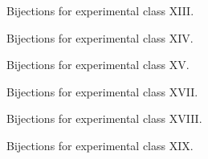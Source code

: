\begin{comment}
\begin{figure}[ht!]
    \centering
    
    \caption{Bijections for experimental class XII.}
    \label{fig:expgrp_XII}
\end{figure}
\end{comment}


\begin{figure}[ht!]
    \centering
    
    \caption{Bijections for experimental class XIII.}
    \label{fig:expgrp_XIII}
\end{figure}


\begin{figure}[ht!]
    \centering
    
    \caption{Bijections for experimental class XIV.}
    \label{fig:expgrp_XIV}
\end{figure}


\begin{figure}[ht!]
    \centering
    
    \caption{Bijections for experimental class XV.}
    \label{fig:expgrp_XV}
\end{figure}


\begin{comment}
\begin{figure}[ht!]
    \centering
    
    \caption{Bijections for experimental class XVI.}
    \label{fig:expgrp_XVI}
\end{figure}
\end{comment}


\begin{figure}[ht!]
    \centering
    
    \caption{Bijections for experimental class XVII.}
    \label{fig:expgrp_XVII}
\end{figure}


\begin{figure}[ht!]
    \centering
    
    \caption{Bijections for experimental class XVIII.}
    \label{fig:expgrp_XVIII}
\end{figure}


\begin{figure}[ht!]
    \centering
    
    \caption{Bijections for experimental class XIX.}
    \label{fig:expgrp_XIX}
\end{figure}


